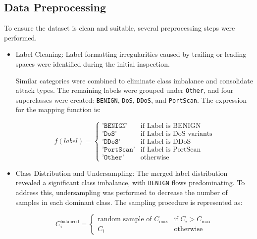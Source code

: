 \documentclass[conference]{IEEEtran}
\begin{document}
\subsection{Data Preprocessing}

To ensure the dataset is clean and suitable, several preprocessing steps were performed. 

\begin{itemize}
    \item Label Cleaning: Label formatting irregularities caused by trailing or leading spaces were identified during the initial inspection.  %


Similar categories were combined to eliminate class imbalance and consolidate attack types.  The remaining labels were grouped under \texttt{Other}, and four superclasses were created: \texttt{BENIGN}, \texttt{DoS}, \texttt{DDoS}, and \texttt{PortScan}.  The expression for the mapping function is: 

\begin{equation}
    f(label)= 
\begin{cases}
\texttt{'BENIGN'} & \text{if Label is BENIGN} \\
\texttt{'DoS'} & \text{if Label is DoS variants} \\
\texttt{'DDoS'} & \text{if Label is DDoS} \\
\texttt{'PortScan'} & \text{if Label is PortScan} \\
\texttt{'Other'} & \text{otherwise}
\end{cases}
\end{equation}

\item Class Distribution and Undersampling: The merged label distribution revealed a significant class imbalance, with \texttt{BENIGN} flows predominating. To address this, undersampling was performed to decrease the number of samples in each dominant class. The sampling procedure is represented as:

\begin{equation}
    C_i^{\text{balanced}} =
\begin{cases}
\text{random sample of } C_{\text{max}} & \text{if } C_i > C_{\text{max}} \\
C_i & \text{otherwise}
\end{cases}
\end{equation}


\end{itemize}
\end{document}
